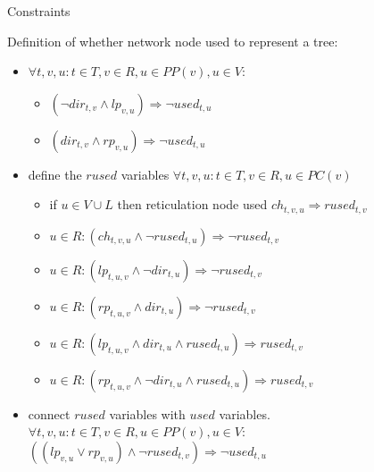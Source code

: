 \documentclass[runningheads, envcountsame, a4paper]{llncs}
\begin{document}
Constraints

Definition of whether network node used to represent a tree:
\begin{itemize}
\item $\forall t, v, u: t \in T, v \in R, u \in PP(v), u \in V$:
    \begin{itemize}
    \item $(\neg dir_{t,v} \wedge lp_{v,u}) \Rightarrow \neg used_{t,u}$ 
    \item $(dir_{t,v} \wedge rp_{v,u}) \Rightarrow \neg used_{t,u}$ 
    \end{itemize}
\item define the $rused$ variables $\forall t, v, u: t \in T, v \in R, u \in PC(v)$
    \begin{itemize}
    \item if $u \in V \cup L$ then reticulation node used $ch_{t,v,u} \Rightarrow rused_{t,v}$
    \item $u \in R : (ch_{t,v,u} \wedge \neg rused_{t,u}) \Rightarrow \neg rused_{t,v}$

    \item $u \in R : (lp_{t,u,v} \wedge \neg dir_{t,u}) \Rightarrow \neg rused_{t,v}$
    \item $u \in R : (rp_{t,u,v} \wedge dir_{t,u}) \Rightarrow \neg rused_{t,v}$

    \item $u \in R : (lp_{t,u,v} \wedge dir_{t,u} \wedge rused_{t,u}) \Rightarrow rused_{t,v}$
    \item $u \in R : (rp_{t,u,v} \wedge \neg dir_{t,u} \wedge rused_{t,u}) \Rightarrow rused_{t,v}$
    \end{itemize}
\item connect $rused$ variables with $used$ variables. $\forall t, v, u: t \in T, v \in R, u \in PP(v), u \in V$:
    $((lp_{v,u} \vee rp_{v,u}) \wedge \neg rused_{t,v}) \Rightarrow \neg used_{t,u}$
\end{itemize}
\end{document}
